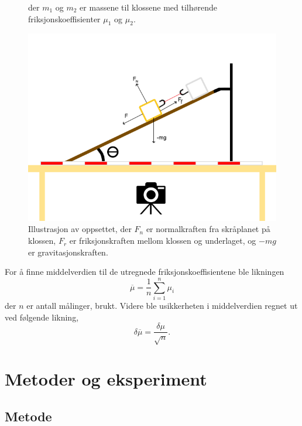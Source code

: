 \documentclass[10pt,a4paper]{report}
\begin{document}
\begin{figure}
der $m_1$ og $m_2$ er massene til klossene med tilhørende friksjonskoeffisienter $\mu_1$ og $\mu_2$.
\begin{center}
\includegraphics[scale=0.5]{withforces}
\caption{Illustrasjon av oppsettet, der $F_n$ er normalkraften fra skråplanet på klossen, $F_r$ er friksjonskraften mellom klossen og underlaget, og $-mg$ er gravitasjonskraften.}
\end{center}
\label{oppsett}
\end{figure}

For å finne middelverdien til de utregnede friksjonskoeffisientene ble likningen
\begin{equation}
\overline{\mu} = \dfrac{1}{n}\sum_{i=1}^{n}\mu_i
\end{equation}
 der $n$ er antall målinger, brukt. Videre ble usikkerheten i middelverdien regnet ut ved følgende likning,
\begin{equation}
\delta\overline{\mu} = \dfrac{\delta\mu}{\sqrt{n}}.
\end{equation}

\chapter*{Metoder og eksperiment}
\section*{Metode}
\end{document}
